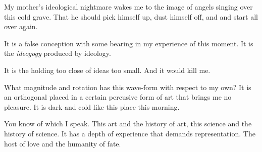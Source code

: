 

My mother's ideological nightmare wakes me to the image of angels
singing over this cold grave.  That he should pick himself up, dust
himself off, and and start all over again.  

It is a false conception with some bearing in my experience of this
moment.  It is the {\it ideogogy} produced by ideology.  

It is the holding too close of ideas too small.  And it would kill me.

What magnitude and rotation has this wave-form with respect to my own?
It is an orthogonal placed in a certain percusive form of art that
brings me no pleasure.  It is dark and cold like this place this
morning.

You know of which I speak.  This art and the history of art, this
science and the history of science.  It has a depth of experience that
demands representation.  The host of love and the humanity of fate.

\bye
